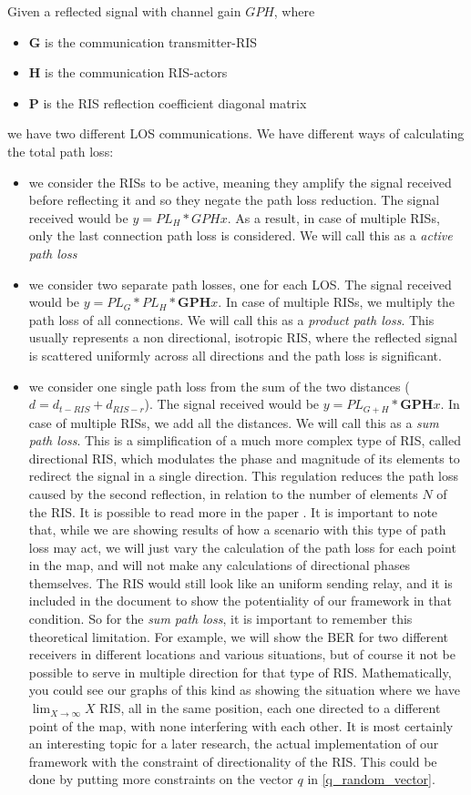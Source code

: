 Given a reflected signal with channel gain $GPH$, where
\begin{itemize}
  \item $\bm{G}$ is the communication transmitter-RIS
  \item $\bm{H}$ is the communication RIS-actors
  \item $\bm{P}$ is the RIS reflection coefficient diagonal matrix
\end{itemize}
we have two different LOS communications. We have different ways of calculating the total path loss:
\begin{itemize}
  \item we consider the RISs to be active, meaning they amplify the signal received before reflecting it and so they negate the path loss reduction. The signal received would be $y = PL_H * GPHx$. As a result, in case of multiple RISs, only the last connection path loss is considered. We will call this as a \textit{active path loss}
  \item we consider two separate path losses, one for each LOS. The signal received would be $y = PL_G * PL_H * \bm{GPH}x$. In case of multiple RISs, we multiply the path loss of all connections. We will call this as a \textit{product path loss}. This usually represents a non directional, isotropic RIS, where the reflected signal is scattered uniformly across all directions and the path loss is significant.
  \item we consider one single path loss from the sum of the two distances ($d = d_{t-RIS} + d_{RIS-r}$). The signal received would be $y = PL_{G+H} * \bm{GPH}x$. In case of multiple RISs, we add all the distances. We will call this as a \textit{sum path loss}. This is a simplification of a much more complex type of RIS, called directional RIS, which modulates the phase and magnitude of its elements to redirect the signal in a single direction. This regulation reduces the path loss caused by the second reflection, in relation to the number of elements $N$ of the RIS. It is possible to read more in the paper \cite{8888223}. It is important to note that, while we are showing results of how a scenario with this type of path loss may act, we will just vary the calculation of the path loss for each point in the map, and will not make any calculations of directional phases themselves. The RIS would still look like an uniform sending relay, and it is included in the document to show the potentiality of our framework in that condition. So for the \textit{sum path loss}, it is important to remember this theoretical limitation. For example, we will show the BER for two different receivers in different locations and various situations, but of course it not be possible to serve in multiple direction for that type of RIS. Mathematically, you could see our graphs of this kind as showing the situation where we have  $\lim_{X \to \infty} X$ RIS, all in the same position, each one directed to a different point of the map, with none interfering with each other. It is most certainly an interesting topic for a later research, the actual implementation of our framework with the constraint of directionality of the RIS. This could be done by putting more constraints on the vector $q$ in \eqref{q_random_vector}.
\end{itemize}

